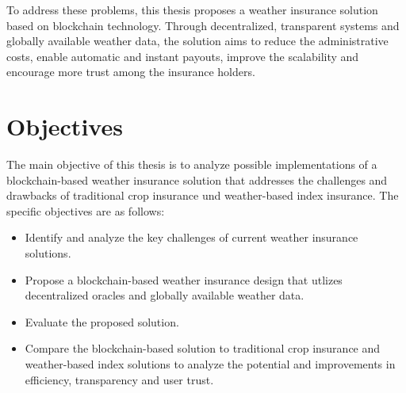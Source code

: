 To address these problems, this thesis proposes a weather insurance solution based on blockchain technology. Through decentralized, transparent systems and globally available weather data, the solution aims to reduce the administrative costs, enable automatic and instant payouts, improve the scalability and encourage more trust among the insurance holders.

\section{Objectives}\label{section:objectives}

The main objective of this thesis is to analyze possible implementations of a blockchain-based weather insurance solution that addresses the challenges and drawbacks of traditional crop insurance und weather-based index insurance. The specific objectives are as follows:

\begin{itemize}
    \item Identify and analyze the key challenges of current weather insurance solutions.
    \item Propose a blockchain-based weather insurance design that utlizes decentralized oracles and globally available weather data.
    \item Evaluate the proposed solution.
    \item Compare the blockchain-based solution to traditional crop insurance and weather-based index solutions to analyze the potential and improvements in efficiency, transparency and user trust.
\end{itemize}
